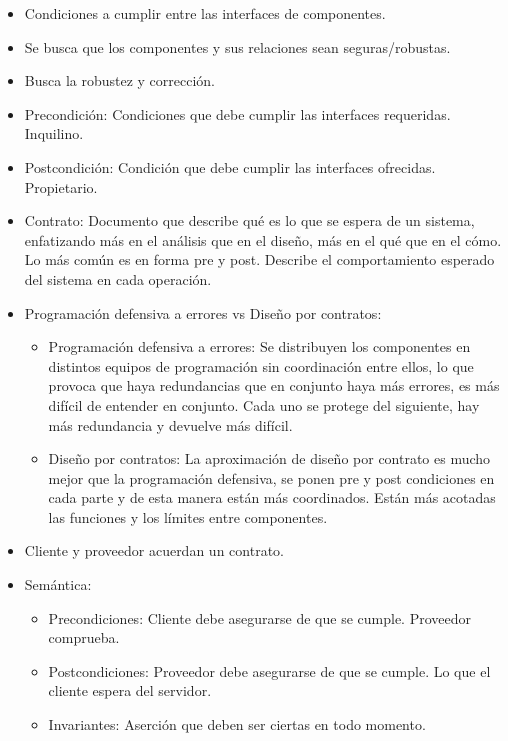 \documentclass[12pt, twoside, openright]{report} %
\begin{document}
    \begin{itemize}
    
    \item
      Condiciones a cumplir entre las interfaces de componentes.
    \item
      Se busca que los componentes y sus relaciones sean
      seguras/robustas.
    \item
      Busca la robustez y corrección.
    \item
      Precondición: Condiciones que debe cumplir las interfaces
      requeridas. Inquilino.
    \item
      Postcondición: Condición que debe cumplir las interfaces
      ofrecidas. Propietario.
    \item
      Contrato: Documento que describe qué es lo que se espera de un
      sistema, enfatizando más en el análisis que en el diseño, más en
      el qué que en el cómo. Lo más común es en forma pre y post.
      Describe el comportamiento esperado del sistema en cada operación.
    \item
      Programación defensiva a errores vs Diseño por contratos:

      \begin{itemize}
      
      \item
        Programación defensiva a errores: Se distribuyen los componentes
        en distintos equipos de programación sin coordinación entre
        ellos, lo que provoca que haya redundancias que en conjunto haya
        más errores, es más difícil de entender en conjunto. Cada uno se
        protege del siguiente, hay más redundancia y devuelve más
        difícil.
      \item
        Diseño por contratos: La aproximación de diseño por contrato es
        mucho mejor que la programación defensiva, se ponen pre y post
        condiciones en cada parte y de esta manera están más
        coordinados. Están más acotadas las funciones y los límites
        entre componentes.
      \end{itemize}
    \item
      Cliente y proveedor acuerdan un contrato.
    \item
      Semántica:

      \begin{itemize}
      
      \item
        Precondiciones: Cliente debe asegurarse de que se cumple.
        Proveedor comprueba.
      \item
        Postcondiciones: Proveedor debe asegurarse de que se cumple. Lo
        que el cliente espera del servidor.
      \item
        Invariantes: Aserción que deben ser ciertas en todo momento.


\end{itemize}
\end{itemize}
\end{document}
